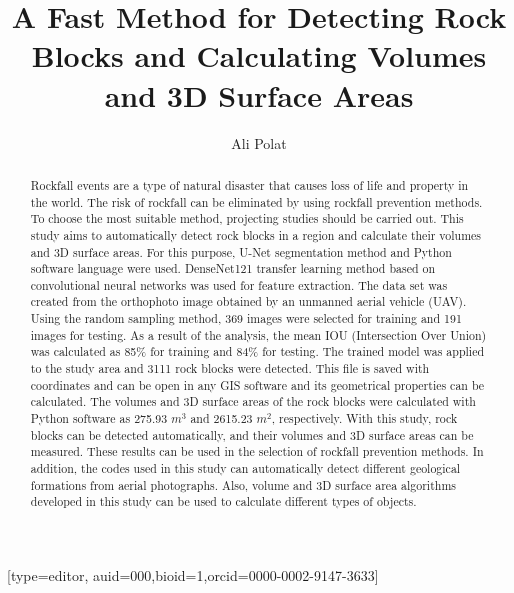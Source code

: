 \documentclass[a4paper,fleqn]{cas-sc}
\begin{document}
\let\WriteBookmarks\relax
\def\floatpagepagefraction{1}
\def\textpagefraction{.001}

\title [mode = title]{A Fast Method for Detecting Rock Blocks and Calculating Volumes and 3D Surface Areas}


\author[0]{Ali Polat}[type=editor,
                        auid=000,bioid=1,orcid=0000-0002-9147-3633]




\address[0]{Provincial Directorate of Disaster and Emergency, 58000, Sivas, Turkey}


\begin{abstract}
Rockfall events are a type of natural disaster that causes loss of life and property in the world. The risk of rockfall can be eliminated by using rockfall prevention methods. To choose the most suitable method, projecting studies should be carried out. This study aims to automatically detect rock blocks in a region and calculate their volumes and 3D surface areas. For this purpose, U-Net segmentation method and Python software language were used. DenseNet121 transfer learning method based on convolutional neural networks was used for feature extraction. The data set was created from the orthophoto image obtained by an unmanned aerial vehicle (UAV). Using the random sampling method, 369 images were selected for training and 191 images for testing. As a result of the analysis, the mean IOU (Intersection Over Union) was calculated as 85\% for training and 84\% for testing. The trained model was applied to the study area and 3111 rock blocks were detected. This file is saved with coordinates and can be open in any GIS software and its geometrical properties can be calculated. The volumes and 3D surface areas of the rock blocks were calculated with Python software as 275.93 $m^3$ and 2615.23 $m^2$, respectively. With this study, rock blocks can be detected automatically, and their volumes and 3D surface areas can be measured. These results can be used in the selection of rockfall prevention methods. In addition, the codes used in this study can automatically detect different geological formations from aerial photographs. Also, volume and 3D surface area algorithms developed in this study can be used to calculate different types of objects.
\end{abstract}
 
\end{document}
